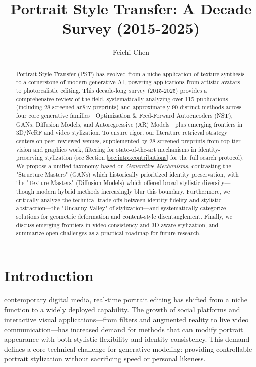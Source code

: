 \documentclass[journal]{IEEEtran}
\begin{document}
\title{Portrait Style Transfer: A Decade Survey (2015-2025)}
\author{Feichi Chen}

\maketitle

\begin{abstract}
  Portrait Style Transfer (PST) has evolved from a niche application of texture synthesis to a cornerstone of modern generative AI, powering applications from artistic avatars to photorealistic editing. This decade-long survey (2015-2025) provides a comprehensive review of the field, systematically analyzing over 115 publications (including 28 screened arXiv preprints) and approximately 90 distinct methods across four core generative families---Optimization \& Feed-Forward Autoencoders (NST), GANs, Diffusion Models, and Autoregressive (AR) Models---plus emerging frontiers in 3D/NeRF and video stylization. To ensure rigor, our literature retrieval strategy centers on peer-reviewed venues, supplemented by 28 screened preprints from top-tier vision and graphics work, filtering for state-of-the-art mechanisms in identity-preserving stylization (see Section \ref{sec:intro:contributions} for the full search protocol). We propose a unified taxonomy based on \textit{Generative Mechanisms}, contrasting the "Structure Masters" (GANs) which historically prioritized identity preservation, with the "Texture Masters" (Diffusion Models) which offered broad stylistic diversity---though modern hybrid methods increasingly blur this boundary. Furthermore, we critically analyze the technical trade-offs between identity fidelity and stylistic abstraction---the "Uncanny Valley" of stylization---and systematically categorize solutions for geometric deformation and content-style disentanglement. Finally, we discuss emerging frontiers in video consistency and 3D-aware stylization, and summarize open challenges as a practical roadmap for future research.
\end{abstract}

\section{Introduction}
\label{sec:intro}

 contemporary digital media, real-time portrait editing has shifted from a niche function to a widely deployed capability. The growth of social platforms and interactive visual applications—from filters and augmented reality to live video communication—has increased demand for methods that can modify portrait appearance with both stylistic flexibility and identity consistency. This demand defines a core technical challenge for generative modeling: providing controllable portrait stylization without sacrificing speed or personal likeness.
\end{document}
